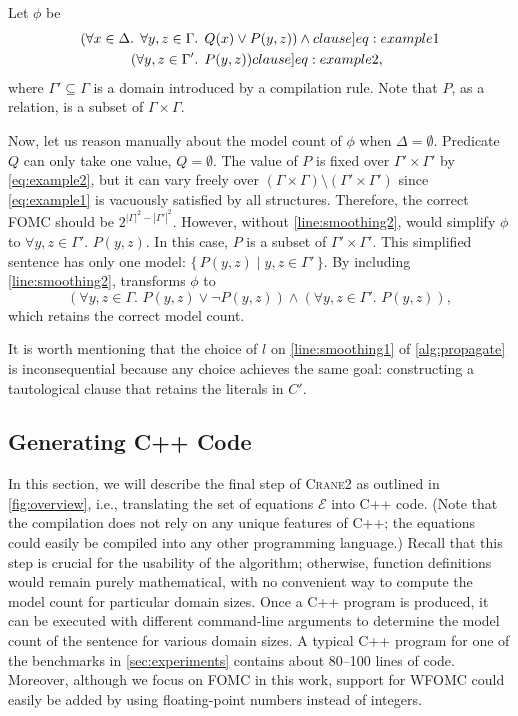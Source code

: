\documentclass[a4paper,UKenglish,cleveref,autoref,table]{lipics-v2021}
\newcommand{\Cranetwo}{\textsc{Crane2}}
\begin{document}
\begin{example}\label{example:basecasesmoothing}
  Let $\phi$ be
  \begin{align}
    (\forall x \in \Delta\text{. }\forall y, z \in \Gamma&\text{. }Q(x) \lor P(y, z))\land{}\label[clause]{eq:example1}\\
    (\forall y, z \in \Gamma'&\text{. }P(y, z))\label[clause]{eq:example2},
  \end{align}
  where $\Gamma' \subseteq \Gamma$ is a domain introduced by a compilation rule.
  Note that $P$, as a relation, is a subset of $\Gamma \times \Gamma$.

  Now, let us reason manually about the model count of $\phi$ when
  $\Delta = \emptyset$. Predicate $Q$ can only take one value, $Q = \emptyset$.
  The value of $P$ is fixed over $\Gamma' \times \Gamma'$ by \cref{eq:example2},
  but it can vary freely over
  $(\Gamma \times \Gamma) \setminus (\Gamma' \times \Gamma')$ since
  \cref{eq:example1} is vacuously satisfied by all structures. Therefore, the
  correct FOMC should be $2^{|\Gamma|^2 - |\Gamma'|^2}$. However, without
  \autoref{line:smoothing2}, \Propagate would simplify $\phi$ to
  $\forall y, z \in \Gamma'\text{. }P(y, z)$. In this case, $P$ is a subset of
  $\Gamma' \times \Gamma'$. This simplified sentence has only one model:
  $\{\, P(y, z) \mid y, z \in \Gamma' \,\}$. By including
  \autoref{line:smoothing2}, \Propagate transforms $\phi$ to
  \[
    (\forall y, z \in \Gamma\text{. }P(y, z) \lor \neg P(y, z)) \land (\forall y, z \in \Gamma'\text{. }P(y, z)),
  \]
  which retains the correct model count.
\end{example}

It is worth mentioning that the choice of $l$ on \autoref{line:smoothing1} of
\cref{alg:propagate} is inconsequential because any choice achieves the same
goal: constructing a tautological clause that retains the literals in $C'$.

\subsection{Generating C++ Code}\label{sec:cpp}

In this section, we will describe the final step of \Cranetwo{} as outlined in
\cref{fig:overview}, i.e., translating the set of equations $\mathcal{E}$ into
C++ code. (Note that the compilation does not rely on any unique features of
C++; the equations could easily be compiled into any other programming
language.) Recall that this step is crucial for the usability of the algorithm;
otherwise, function definitions would remain purely mathematical, with no
convenient way to compute the model count for particular domain sizes. Once a
C++ program is produced, it can be executed with different command-line
arguments to determine the model count of the sentence for various domain sizes.
A typical C++ program for one of the benchmarks in \cref{sec:experiments}
contains about \numrange{80}{100} lines of code. Moreover, although we focus on
FOMC in this work, support for WFOMC could easily be added by using
floating-point numbers instead of integers.
\end{document}
